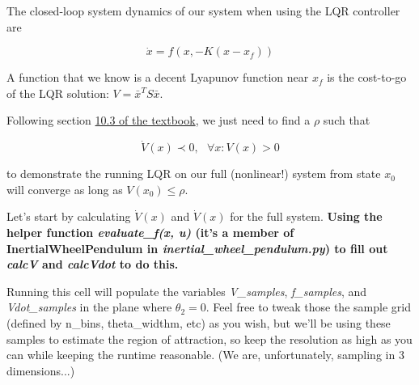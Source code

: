 \documentclass[11pt]{article}
\begin{document}
The closed-loop system dynamics of our system when using the LQR
controller are

\[ \dot{x} = f(x, -K(x-x_f)) \]

A function that we know is a decent Lyapunov function near \(x_f\) is
the cost-to-go of the LQR solution: \(V = \bar{x}^T S \bar{x}\).

Following section
\href{http://underactuated.csail.mit.edu/underactuated.html?chapter=lyapunov}{10.3
of the textbook}, we just need to find a \(\rho\) such that

\[ 
\dot{V}(x) \prec 0, \ \ \  \forall x : V(x) > 0
\]

to demonstrate the running LQR on our full (nonlinear!) system from
state \(x_0\) will converge as long as \(V(x_0) \leq \rho\).

Let's start by calculating \(\dot{V}(x)\) and \(\dot{V}(x)\) for the
full system. \textbf{Using the helper function \emph{evaluate\_f(x, u)}
(it's a member of InertialWheelPendulum in
\emph{inertial\_wheel\_pendulum.py}) to fill out \emph{calcV} and
\emph{calcVdot} to do this.}

Running this cell will populate the variables \emph{V\_samples},
\emph{f\_samples}, and \emph{Vdot\_samples} in the plane where
\(\theta_2 = 0\). Feel free to tweak those the sample grid (defined by
n\_bins, theta\_widthm, etc) as you wish, but we'll be using these
samples to estimate the region of attraction, so keep the resolution as
high as you can while keeping the runtime reasonable. (We are,
unfortunately, sampling in 3 dimensions...)
\end{document}

